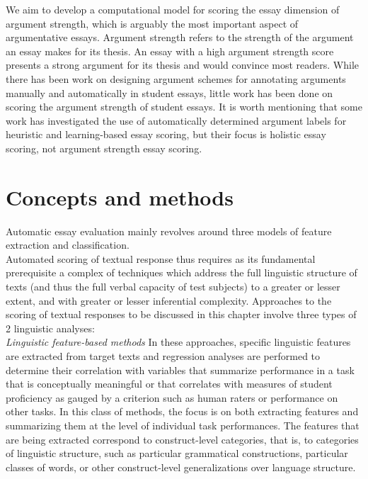 \documentclass[BTech]{nitkdiss}
\begin{document}
We aim to develop a computational model for scoring the essay dimension of argument strength, which is arguably the most important aspect of argumentative essays. Argument strength refers to the strength of the argument an essay makes for its thesis. An essay with a high argument strength score presents a strong argument for its thesis and would convince most readers. While there has been work on designing argument schemes for annotating arguments manually and automatically in student essays, little work has been done on scoring the argument strength of student essays. It is worth mentioning that some work has investigated the use of automatically determined argument labels for heuristic and learning-based essay scoring, but their focus is holistic essay scoring, not argument strength essay scoring.


\section{Concepts and methods}
Automatic essay evaluation mainly revolves around three models of feature extraction and classification.\\

Automated scoring of textual response thus requires as its fundamental prerequisite a complex of techniques which address the full linguistic structure of texts (and thus the full verbal capacity of test subjects) to a greater or lesser extent, and with greater or lesser inferential complexity. Approaches to the scoring of textual responses to be discussed in this chapter involve three types of 2 linguistic analyses:\\

\textit{Linguistic feature-based methods} In these approaches, specific linguistic features are extracted from target texts and regression analyses are performed to determine their correlation with variables that summarize performance in a task that is conceptually meaningful or that correlates with measures of student proficiency as gauged by a criterion such as human raters or performance on other tasks. In this class of methods, the focus is on both extracting features and summarizing them at the level of individual task performances. The features that are being extracted correspond to construct-level categories, that is, to categories of linguistic structure, such as particular grammatical constructions, particular classes of words, or other construct-level generalizations over language structure.\\
\end{document}
